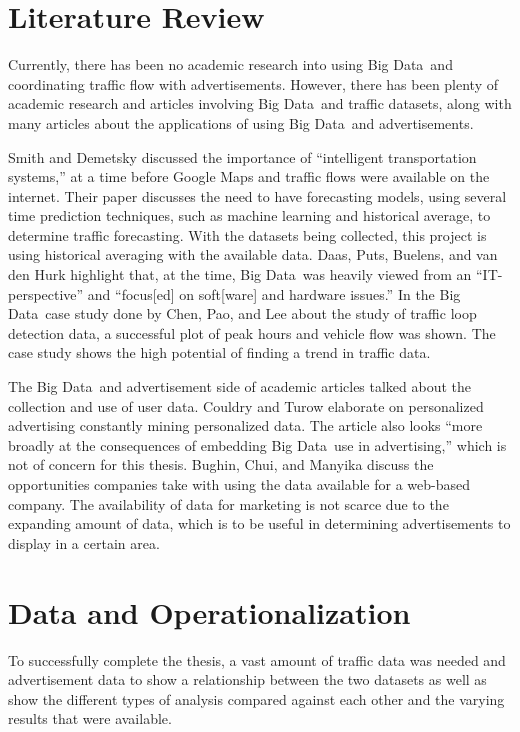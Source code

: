 \documentclass[titlepage,twocolumn]{article}
\newcommand{\BigData}{Big Data}
\begin{document}
\section{Literature Review}%

Currently, there has been no academic research into using \BigData\ and coordinating traffic flow with advertisements. However, there has been plenty of academic research and articles involving \BigData\ and traffic datasets, along with many articles about the applications of using \BigData\ and advertisements.
\par
Smith and Demetsky \cite{smith1997traffic} discussed the importance of “intelligent transportation systems,” at a time before Google Maps and traffic flows were available on the internet. Their paper discusses the need to have forecasting models, using several time prediction techniques, such as machine learning and historical average, to determine traffic forecasting. With the datasets being collected, this project is using historical averaging with the available data. Daas, Puts, Buelens, and van den Hurk \cite{BigDataOfficialStats} highlight that, at the time, \BigData\ was heavily viewed from an “IT-perspective” and “focus[ed] on soft[ware] and hardware issues.” In the \BigData\ case study done by Chen, Pao, and Lee \cite{7004425} about the study of traffic loop detection data, a successful plot of peak hours and vehicle flow was shown. The case study shows the high potential of finding a trend in traffic data.
\par
The \BigData\ and advertisement side of academic articles talked about the collection and use of user data. Couldry and Turow \cite{IJoC2166} elaborate on personalized advertising constantly mining personalized data. The article also looks “more broadly at the consequences of embedding \BigData\ use in advertising,” which is not of concern for this thesis. Bughin, Chui, and Manyika \cite{7bac15dae50148d98f3263d7f91d8130} discuss the opportunities companies take with using the data available for a web-based company. The availability of data for marketing is not scarce due to the expanding amount of data, which is to be useful in determining advertisements to display in a certain area.
								
\section{Data and Operationalization}

To successfully complete the thesis, a vast amount of traffic data was needed and advertisement data to show a relationship between the two datasets as well as show the different types of analysis compared against each other and the varying results that were available. 
\end{document}
